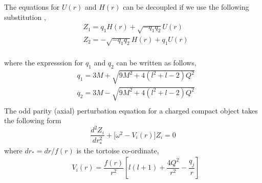 \documentclass[aps,prd,twocolumn,floatfix,noshowpacs,tightenlines,noshowkeys,superscriptaddress,amsmath,amssymb,
nofootinbib]{revtex4-1}
\renewcommand\[{\begin{equation}}
\renewcommand\]{\end{equation}}
\begin{document}
 The equations for $U(r)$ and $H(r)$ can be decoupled if we use the following substitution \cite{Chandrasekhar:1985kt}, 
 \begin{equation}\label{Z1_Z2}
 \begin{aligned}
 &{Z_1}=q_1 H(r)+\sqrt{-q_1 q_2}U(r)\\
 &{Z_2}=-\sqrt{-q_1 q_2} H(r)+q_1 U(r)\\
 \end{aligned}  
 \end{equation}
 
 where the expresssion for $q_1$ and $q_2$ can be written as follows,
 \begin{equation}\label{q1_q2}
 \begin{aligned}
 &{q_1}=3 M+\sqrt{9 M^2+4 \left(l^2+l-2\right) Q^2}\\
 &{q_2}=3 M-\sqrt{9 M^2+4 \left(l^2+l-2\right) Q^2}\\
 \end{aligned}  
 \end{equation}
 The odd parity (axial) perturbation equation for a charged compact object takes the following form \cite{Chandrasekhar:1985kt}
\begin{equation}\label{perturb_eq}
\frac{d^2 Z_{i}}{dr_{*}^2}+\big[\omega^2-V_{i}(r)\big]Z_{i}=0  
\end{equation}
where $dr_{*}=dr/f(r)$ is the tortoise co-ordinate, 
\begin{equation}\label{perturb_potential}
	\begin{aligned}
	&{V}_{i}(r)=\dfrac{f(r)}{r^2} \left[l (l+1)+\dfrac{4 Q^2}{r^2}-\dfrac{q_j}{r}\right]\\
	\end{aligned}
\end{equation}
\end{document}

